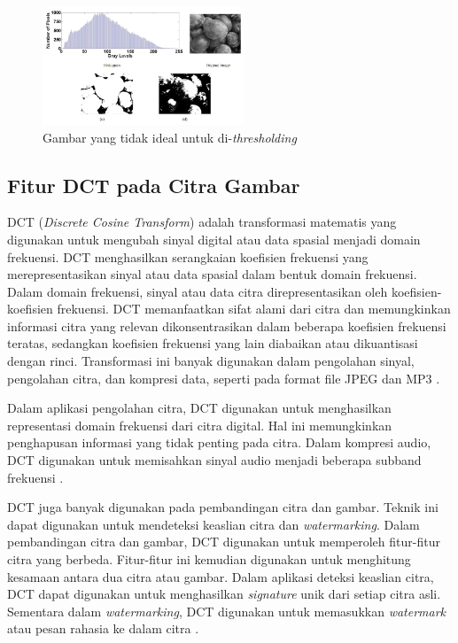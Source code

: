 \begin{figure}[!ht]
	\centering
	\includegraphics[width=6cm]{contents/chapter-2/2-histogramnonideal.png}
	\caption[Gambar yang tidak ideal untuk di-\emph{thresholding}]{Gambar yang tidak ideal untuk di-\emph{thresholding} \cite{fiturhistogram}}
	\label{Fig: 2-histogramnonideal}
\end{figure}

\clearpage

\subsection{Fitur DCT pada Citra Gambar}
DCT (\emph{Discrete Cosine Transform}) adalah transformasi matematis yang digunakan untuk mengubah sinyal digital atau data spasial menjadi domain frekuensi.
DCT menghasilkan serangkaian koefisien frekuensi yang merepresentasikan sinyal atau data spasial dalam bentuk domain frekuensi. Dalam domain frekuensi, sinyal
atau data citra direpresentasikan oleh koefisien-koefisien frekuensi. DCT memanfaatkan sifat alami dari citra dan memungkinkan informasi citra yang relevan
dikonsentrasikan dalam beberapa koefisien frekuensi teratas, sedangkan koefisien frekuensi yang lain diabaikan atau dikuantisasi dengan rinci. Transformasi ini
banyak digunakan dalam pengolahan sinyal, pengolahan citra, dan kompresi data, seperti pada format file JPEG dan MP3 \cite{dct}.

Dalam aplikasi pengolahan citra, DCT digunakan untuk menghasilkan representasi domain frekuensi dari citra digital. Hal ini memungkinkan penghapusan informasi
yang tidak penting pada citra. Dalam kompresi audio, DCT digunakan untuk memisahkan sinyal audio menjadi beberapa subband frekuensi \cite{dct}.

DCT juga banyak digunakan pada pembandingan citra dan gambar. Teknik ini dapat digunakan untuk mendeteksi keaslian citra dan \emph{watermarking}. Dalam
pembandingan citra dan gambar, DCT digunakan untuk memperoleh fitur-fitur citra yang berbeda. Fitur-fitur ini kemudian digunakan untuk menghitung kesamaan
antara dua citra atau gambar. Dalam aplikasi deteksi keaslian citra, DCT dapat digunakan untuk menghasilkan \emph{signature} unik dari setiap citra asli.
Sementara dalam \emph{watermarking}, DCT digunakan untuk memasukkan \emph{watermark} atau pesan rahasia ke dalam citra \cite{dctwatermark}.

